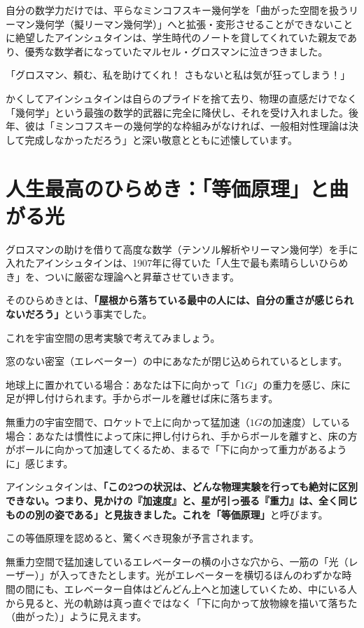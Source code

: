 自分の数学力だけでは、平らなミンコフスキー幾何学を「曲がった空間を扱うリーマン幾何学（擬リーマン幾何学）」へと拡張・変形させることができないことに絶望したアインシュタインは、学生時代のノートを貸してくれていた親友であり、優秀な数学者になっていたマルセル・グロスマンに泣きつきました。

「グロスマン、頼む、私を助けてくれ！ さもないと私は気が狂ってしまう！」

かくしてアインシュタインは自らのプライドを捨て去り、物理の直感だけでなく「幾何学」という最強の数学的武器に完全に降伏し、それを受け入れました。後年、彼は「ミンコフスキーの幾何学的な枠組みがなければ、一般相対性理論は決して完成しなかっただろう」と深い敬意とともに述懐しています。

\section{人生最高のひらめき：「等価原理」と曲がる光}

グロスマンの助けを借りて高度な数学（テンソル解析やリーマン幾何学）を手に入れたアインシュタインは、1907年に得ていた「人生で最も素晴らしいひらめき」を、ついに厳密な理論へと昇華させていきます。

そのひらめきとは、\textbf{「屋根から落ちている最中の人には、自分の重さが感じられないだろう」}という事実でした。

これを宇宙空間の思考実験で考えてみましょう。

窓のない密室（エレベーター）の中にあなたが閉じ込められているとします。

地球上に置かれている場合：あなたは下に向かって「\(1G\)」の重力を感じ、床に足が押し付けられます。手からボールを離せば床に落ちます。

無重力の宇宙空間で、ロケットで上に向かって猛加速（\(1G\)の加速度）している場合：あなたは慣性によって床に押し付けられ、手からボールを離すと、床の方がボールに向かって加速してくるため、まるで「下に向かって重力があるように」感じます。

アインシュタインは、\textbf{「この2つの状況は、どんな物理実験を行っても絶対に区別できない。つまり、見かけの『加速度』と、星が引っ張る『重力』は、全く同じものの別の姿である」と見抜きました。これを「等価原理」}と呼びます。

この等価原理を認めると、驚くべき現象が予言されます。

無重力空間で猛加速しているエレベーターの横の小さな穴から、一筋の「光（レーザー）」が入ってきたとします。光がエレベーターを横切るほんのわずかな時間の間にも、エレベーター自体はどんどん上へと加速していくため、中にいる人から見ると、光の軌跡は真っ直ぐではなく「下に向かって放物線を描いて落ちた（曲がった）」ように見えます。

